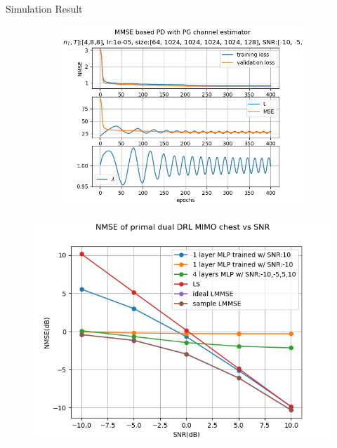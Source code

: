 \documentclass[hyperref={bookmarks=false}]{beamer}
\numberwithin{figure}{section}
\begin{document}
\begin{frame}[allowframebreaks]{Simulation Result}
\begin{figure}[H]
\begin{subfigure}[b]{.8\linewidth}
    \end{subfigure}
    \begin{subfigure}[b]{.8\linewidth}
        \includegraphics[width=\linewidth]{figures/lr1e-05_[64, 1024, 1024, 1024, 1024, 128]_ep400_SNR_[-10, -5, 5, 10].png}
    \end{subfigure}
    \label{fig:train_result}
\end{figure}

\begin{figure}[h]
    \includegraphics[width=.8\linewidth]{figures/3mlp_Chest_.png}
    \label{fig:test_result}
\end{figure}


\end{frame}
\end{document}
